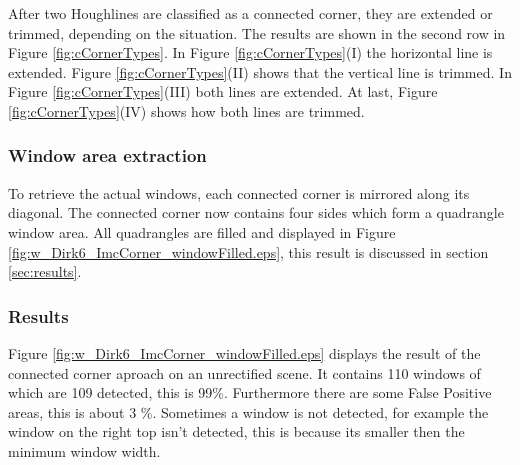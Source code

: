 After two Houghlines are classified as a connected corner, they are extended or
trimmed, depending on the situation. The results are shown in the second row in
Figure \ref{fig:cCornerTypes}.
In Figure \ref{fig:cCornerTypes}(I)  the horizontal line is extended.  Figure
\ref{fig:cCornerTypes}(II) shows that the vertical line is trimmed.  In Figure
\ref{fig:cCornerTypes}(III) both lines are extended.  At last, Figure
\ref{fig:cCornerTypes}(IV) shows how both lines are trimmed.


\subsubsection{Window area extraction}
To retrieve the actual windows, each connected corner is mirrored along its
diagonal. The connected corner now contains four sides which form a 
quadrangle window area.
All quadrangles are filled and displayed in Figure
\ref{fig:w_Dirk6_ImcCorner_windowFilled.eps}, this result is discussed in section
\ref{sec:results}.


\subsubsection{Results}


\newpage
{}

Figure \ref{fig:w_Dirk6_ImcCorner_windowFilled.eps} displays the result of the
connected corner aproach on an unrectified scene.  It contains 110 windows of
which are 109 detected, this is 99\%. Furthermore there are some False Positive
areas, this is about 3 \%.
Sometimes a window is not detected, for example the window on the right top
isn't detected, this is because its smaller then the minimum window width.\\

